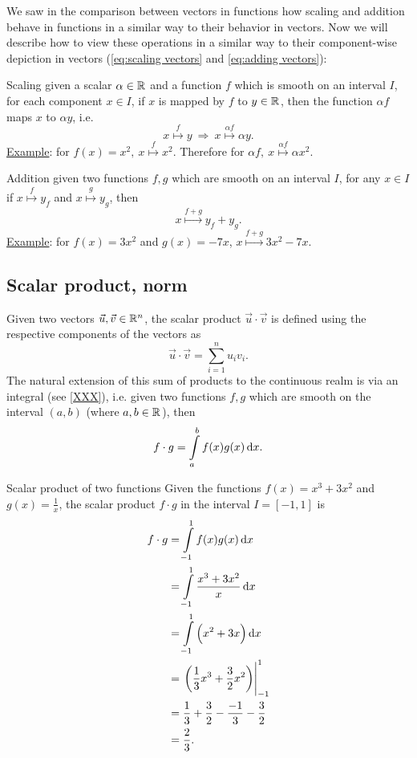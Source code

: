 We saw in the comparison between vectors in functions how scaling and addition behave in functions in a similar way to their behavior in vectors. Now we will describe how to view these operations in a similar way to their component-wise depiction in vectors (\autoref{eq:scaling vectors} and \autoref{eq:adding vectors}):
\begin{descitemize}
	\item[Scaling] given a scalar $\alpha\in\Rs$ and a function $f$ which is smooth on an interval $I$, for each component $x\in I$, if $x$ is mapped by $f$ to $y\in\Rs$, then the function $\alpha f$ maps $x$ to $\alpha y$, i.e.
		\[
			x\overset{f}{\mapsto} y\ \Rightarrow\ x\overset{\alpha f}{\mapsto} \alpha y.
		\]
		\underline{Example}: for $f(x)=x^{2},\ x\overset{f}{\mapsto} x^{2}$. Therefore for $\alpha f,\ x\overset{\alpha f}{\mapsto}\alpha x^{2}$.

	\item[Addition] given two functions $f,g$ which are smooth on an interval $I$, for any $x\in I$ if $x\overset{f}{\mapsto}y_{f}$ and $x\overset{g}{\mapsto}y_{g}$, then
		\[
			x\overset{f+g}{\mapsto} y_{f}+y_{g}.
		\]
		\underline{Example}: for $f(x)=3x^{2}$ and $g(x)=-7x$, $x\overset{f+g}{\mapsto}3x^{2}-7x$.
\end{descitemize}

\subsection{Scalar product, norm}
Given two vectors $\vec{u},\vec{v}\in\Rs[n]$, the scalar product $\vec{u}\cdot\vec{v}$ is defined using the respective components of the vectors as
\[
	\vec{u}\cdot\vec{v}=\sum\limits_{i=1}^{n}u_{i}v_{i}.
\]
The natural extension of this sum of products to the continuous realm is via an integral (see \autoref{XXX}), i.e. given two functions $f,g$ which are smooth on the interval $(a,b)$ (where $a,b\in\Rs$), then
\begin{equation}
	f\cdot g = \int\limits_{a}^{b}f(x)g(x)\dif x.
	\label{eq:scalar_product_functions}
\end{equation}

\begin{example}{Scalar product of two functions}{}
	Given the functions $f(x)=x^{3}+3x^{2}$ and $g(x)=\frac{1}{x}$, the scalar product $f\cdot g$ in the interval $I=\left[-1,1\right]$ is
	\begin{align*}
		f\cdot g &= \int\limits_{-1}^{1}f(x)g(x)\dif x\\
				 &= \int\limits_{-1}^{1}\frac{x^{3}+3x^{2}}{x}\dif x\\
				 &= \int\limits_{-1}^{1}\left(x^{2}+3x\right)\dif x\\
				 &= \left.\left(\frac{1}{3}x^{3}+\frac{3}{2}x^{2}\right) \right|_{-1}^{1}\\
				 &= \frac{1}{3}+\frac{3}{2} - \frac{-1}{3} - \frac{3}{2} \\
				 &= \frac{2}{3}.
	\end{align*}
\end{example}

